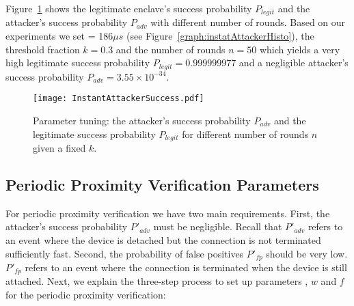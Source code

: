 \newcommand{\timeRoundCaption}{\textbf{Effect of different threshold latencies (\connect).} The figure shows the success probability when no relay attack takes place. The threshold latency \connect $=470\ \mu s$ reaches to $0.999999965$ success probability for number of trials at least 20 ($k.n,\ k=0.4$) out of $n=50$ challenge-response protocol.}

\newcommand{\cumulativeCaption}{\textbf{Cumulative distribution function for latencies.} We set the threshold \connect at 470 $\mu s$ which has a cumulative probability of $0.75$ in the experiment where no rerouting attack takes place with an extremely low probability ($9.73\times10^{-5}$).}

\newcommand{\mainResultCaption}{\textbf{Distinguishing relay attack.} The attacker's success probability $P_{adv}$ and the legitimate success probability $P_{legit}$ in proximity verification for different number of rounds ($n$) given a fixed $k=0.4$.}



\parasaver
{} Figure~\ref{graph:instantAttackerSuccess} shows the legitimate enclave's success probability $P_{legit}$ and the attacker's success probability $P_{adv}$ with different number of rounds. Based on our experiments we set \connect= 186$\mu s$ (see Figure~\ref{graph:instatAttackerHisto}), the threshold fraction $k=0.3$ and the number of rounds $n=50$ which yields a very high legitimate success probability $P_{legit}=0.999999977$ and a negligible attacker's success probability $P_{adv}=3.55\times 10^{-34}$.



\begin{figure}[t]
  \centering
    \texttt{[image: InstantAttackerSuccess.pdf]}
    \caption{Parameter tuning: the attacker's success probability $P_{adv}$ and the legitimate success probability $P_{legit}$ for different number of rounds $n$ given a fixed $k$.}
   \figsaverL
    \label{graph:instantAttackerSuccess}
\end{figure}



\subsection{Periodic Proximity Verification Parameters}
\label{sec:evaluationL:continuousParameters}


For periodic proximity verification we have two main requirements. First, the attacker's success probability $P'_{adv}$ must be negligible. Recall that $P'_{adv}$ refers to an event where the device is detached but the connection is not terminated sufficiently fast. Second, the probability of false positives $P'_{fp}$ should be very low. $P'_{fp}$ refers to an event where the connection is terminated when the device is still attached. Next, we explain the three-step process to set up parameters \detach, $w$ and $f$ for the periodic proximity verification:

